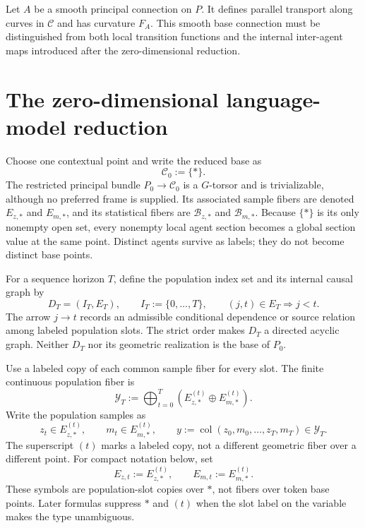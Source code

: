 Let \(A\) be a smooth principal connection on \(P\). It defines parallel transport along curves in \(\mathcal C\) and has curvature \(F_A\). This smooth base connection must be distinguished from both local transition functions and the internal inter-agent maps introduced after the zero-dimensional reduction.

\section{The zero-dimensional language-model reduction}

Choose one contextual point and write the reduced base as
\begin{equation}
\mathcal C_0:=\{\ast\}.
\label{eq:zero-dimensional-base}
\end{equation}
The restricted principal bundle \(P_0\to\mathcal C_0\) is a \(G\)-torsor and is trivializable, although no preferred frame is supplied. Its associated sample fibers are denoted \(E_{z,\ast}\) and \(E_{m,\ast}\), and its statistical fibers are \(\mathscr B_{z,\ast}\) and \(\mathscr B_{m,\ast}\). Because \(\{\ast\}\) is its only nonempty open set, every nonempty local agent section becomes a global section value at the same point. Distinct agents survive as labels; they do not become distinct base points.

For a sequence horizon \(T\), define the population index set and its internal causal graph by
\begin{equation}
D_T=(I_T,E_T),
\qquad
I_T:=\{0,\ldots,T\},
\qquad
(j,t)\in E_T\Longrightarrow j<t.
\label{eq:causal-token-graph}
\end{equation}
The arrow \(j\to t\) records an admissible conditional dependence or source relation among labeled population slots. The strict order makes \(D_T\) a directed acyclic graph. Neither \(D_T\) nor its geometric realization is the base of \(P_0\).

Use a labeled copy of each common sample fiber for every slot. The finite continuous population fiber is
\begin{equation}
\mathcal Y_T
:=
\bigoplus_{t=0}^{T}
\left(E_{z,\ast}^{(t)}\oplus E_{m,\ast}^{(t)}\right).
\label{eq:finite-section-configuration-space}
\end{equation}
Write the population samples as
\begin{equation}
z_t\in E_{z,\ast}^{(t)},
\qquad
m_t\in E_{m,\ast}^{(t)},
\qquad
y:=\operatorname{col}(z_0,m_0,\ldots,z_T,m_T)\in\mathcal Y_T.
\label{eq:random-vertex-sections}
\end{equation}
The superscript \((t)\) marks a labeled copy, not a different geometric fiber over a different point. For compact notation below, set
\begin{equation}
E_{z,t}:=E_{z,\ast}^{(t)},
\qquad
E_{m,t}:=E_{m,\ast}^{(t)}.
\label{eq:vertex-fibers}
\end{equation}
These symbols are population-slot copies over \(\ast\), not fibers over token base points. Later formulas suppress \(\ast\) and \((t)\) when the slot label on the variable makes the type unambiguous.

